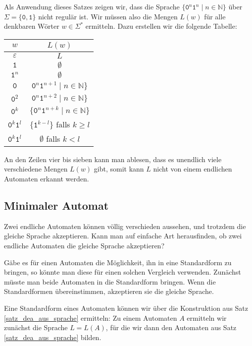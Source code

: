 Als Anwendung dieses Satzes zeigen wir, dass die Sprache
$\{ \texttt{0}^n\texttt{1}^n \;|\; n\in\mathbb N\}$ über
$\Sigma=\{\texttt{0},\texttt{1}\}$
nicht regulär ist.
Wir müssen also die Mengen $L(w)$ für alle denkbaren Wörter $w\in\Sigma^*$
ermitteln.
Dazu erstellen wir die folgende Tabelle:
\begin{center}
\begin{tabular}{|c|c|}
\hline
$w$&$L(w)$\\
\hline
$\varepsilon$&$L$\\
$\texttt{1}$&$\emptyset$\\
$\texttt{1}^n$&$\emptyset$\\
$\texttt{0}$&$\texttt{0}^n\texttt{1}^{n+1}\;|\; n\in\mathbb N\}$\\
$\texttt{0}^2$&$\texttt{0}^n\texttt{1}^{n+2}\;|\; n\in\mathbb N\}$\\
$\texttt{0}^k$&$\{\texttt{0}^n\texttt{1}^{n+k}\;|\; n\in\mathbb N\}$\\
$\texttt{0}^k\texttt{1}^l$&$\{\texttt{1}^{k-l}\}$ falls $k\ge l$\\
$\texttt{0}^k\texttt{1}^l$&$\emptyset $ falls $k<l$\\
\hline
\end{tabular}
\end{center}
An den Zeilen vier bis sieben kann man ablesen, dass es unendlich
viele verschiedene Mengen $L(w)$ gibt, somit kann $L$ nicht von
einem endlichen Automaten erkannt werden.

\subsection{Minimaler Automat\label{regulaer:minimalautomat}}
%
Zwei endliche Automaten können völlig verschieden aussehen,
und trotzdem die gleiche Sprache akzeptieren.
Kann man auf einfache
Art herausfinden, ob zwei endliche Automaten die gleiche Sprache
akzeptieren?

Gäbe es für einen Automaten die Möglichkeit, ihn in eine Standardform
zu bringen, so könnte man diese für einen solchen Vergleich verwenden.
Zunächst müsste man beide Automaten in die Standardform bringen.
Wenn die Standardformen übereinstimmen, akzeptieren sie die gleiche Sprache.

Eine Standardform eines Automaten können wir über die Konstruktion
aus Satz \ref{satz_dea_aus_sprache} ermitteln: Zu einem Automaten
$A$ ermitteln wir zunächst die Sprache $L=L(A)$, für die wir dann
den Automaten aus Satz \ref{satz_dea_aus_sprache} bilden.

